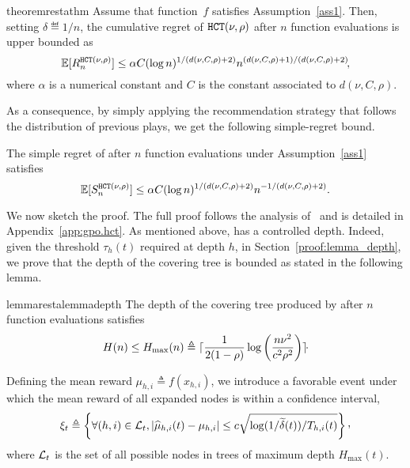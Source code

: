 \begin{restatable}{theorem}{restathm}\label{thm:hct}
	Assume that function~$f$ satisfies Assumption~\ref{ass1}. Then, setting $\delta \eqdef 1/n$, the cumulative regret of ${\texttt{HCT}}(\nu,\rho)$ after $n$ function evaluations is upper bounded as 
\[
	\mathbb{E}[R_n^{\texttt{HCT}{}(\nu,\rho)}] \leq \alpha C (\operatorname{log}n)^{1/(d(\nu,C,\rho)+2)}n^{(d(\nu,C,\rho)+1)/(d(\nu,C,\rho)+2)}\!,
\]
where $\alpha$ is a numerical constant and $C$ is the constant associated to $d(\nu,C,\rho)$.
\end{restatable}\noindent
As a consequence, by simply applying  the recommendation strategy that follows the distribution of previous plays, we get the following simple-regret bound.
\begin{corollary}\label{col}
The simple regret  of {\HCT} after $n$ function evaluations under Assumption~\ref{ass1} satisfies
\[
	\mathbb{E}[S_n^{\texttt{HCT}{}(\nu,\rho)}] \leq \alpha C(\operatorname{log}n)^{1/(d(\nu,C,\rho)+2)}n^{-1/(d(\nu,C,\rho)+2)}.
\]
\end{corollary}
We now sketch the proof. The full proof follows the analysis of~\cite{azar2014online} and is detailed in Appendix~\ref{app:gpo.hct}.
As  mentioned above, \HCT has a controlled depth. Indeed, given the threshold $\tau_h(t)$ required at depth $h$, in Section~\ref{proof:lemma_depth}, we prove that the depth of the covering tree is bounded as stated in the following lemma.
\begin{restatable}{lemma}{restalemmadepth}\label{lemma_depth}
The depth of the covering tree produced by \HCT after $n$ function evaluations satisfies \[H(n) \leq H_{\max}(n) \triangleq \lceil\frac{1}{2(1-\rho)} \operatorname{log}\left( \frac{n\nu^2}{c^2\rho^2} \right)\rceil\!\cdot\]
\end{restatable}
\noindent
Defining the mean reward $\mu_{h,i} \triangleq f(x_{h,i})$, we introduce a favorable event under which the mean reward of all expanded nodes is within a confidence interval,
\[
	\xi_t \triangleq \left\{ \forall (h,i)\in\mathcal{L}_t,  |\hat{\mu}_{h,i}(t) - \mu_{h,i}| \leq c\sqrt{\operatorname{log}(1/\tilde{\delta}(t))/T_{h,i}(t)} \right\}\CommaBin
\]
where $\mathcal{L}_t$ is the set of all possible nodes in trees of maximum depth $H_{\max}(t)$.

